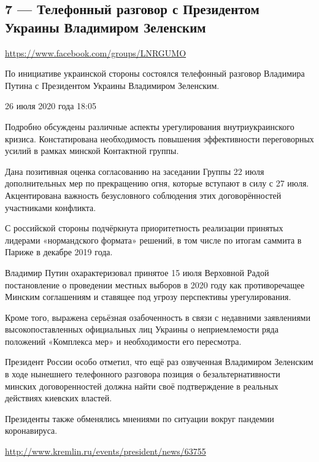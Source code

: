  
 
  
\clearpage
\subsection{7 --- Телефонный разговор с Президентом Украины Владимиром Зеленским}
\label{sec:27_07_2020.fb.lnr.7}
\url{https://www.facebook.com/groups/LNRGUMO}

По инициативе украинской стороны состоялся телефонный разговор Владимира Путина с Президентом Украины Владимиром Зеленским.

26 июля 2020 года
18:05

Подробно обсуждены различные аспекты урегулирования внутриукраинского кризиса.
Констатирована необходимость повышения эффективности переговорных усилий в
рамках минской Контактной группы.

Дана позитивная оценка согласованию на заседании Группы 22 июля дополнительных
мер по прекращению огня, которые вступают в силу с 27 июля.  Акцентирована
важность безусловного соблюдения этих договорённостей участниками конфликта.

С российской стороны подчёркнута приоритетность реализации принятых лидерами
«нормандского формата» решений, в том числе по итогам саммита в Париже в
декабре 2019 года.

Владимир Путин охарактеризовал принятое 15 июля Верховной Радой постановление о
проведении местных выборов в 2020 году как противоречащее Минским соглашениям и
ставящее под угрозу перспективы урегулирования.

Кроме того, выражена серьёзная озабоченность в связи с недавними заявлениями
высокопоставленных официальных лиц Украины о неприемлемости ряда положений
«Комплекса мер» и необходимости его пересмотра.

Президент России особо отметил, что ещё раз озвученная Владимиром Зеленским в
ходе нынешнего телефонного разговора позиция о безальтернативности минских
договоренностей должна найти своё подтверждение в реальных действиях киевских
властей.

Президенты также обменялись мнениями по ситуации вокруг пандемии коронавируса.

\url{http://www.kremlin.ru/events/president/news/63755}
